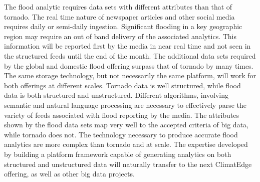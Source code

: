 The flood analytic requires data sets with different attributes than that of tornado. The real time nature of newspaper articles and other social media requires daily or semi-daily ingestion. Significant flooding in a key geographic region may require an out of band delivery of the associated analytics.  This information will be reported first by the media in near real time and not seen in the structured feeds until the end of the month. The additional data sets required by the global and domestic flood offering surpass that of tornado by many times. The same storage technology, but not necessarily the same platform, will work for both offerings at different scales. Tornado data is well structured, while flood data is both structured and unstructured. Different algorithms, involving semantic and natural language processing are necessary to effectively parse the variety of feeds associated with flood reporting by the media.  The attributes shown by the flood  data sets map very well to the accepted criteria of big data, while tornado does not. The technology necessary to produce accurate flood analytics are more complex than tornado and at scale.  The expertise developed by building a platform framework capable of generating analytics on both structured and unstructured data will naturally transfer to the next ClimatEdge\texttrademark{} offering, as well as other big data projects.